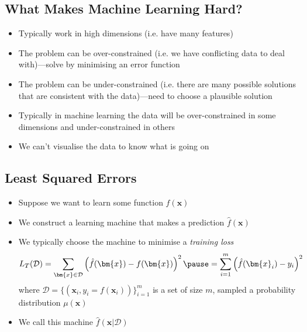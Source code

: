 
\begin{slide}
\section{What Makes Machine Learning Hard?}

\begin{PauseHighLight}
  \begin{itemize}
  \item Typically work in high dimensions (i.e. have many
    features)\pause
  \item The problem can be over-constrained (i.e. we have conflicting
    data to deal with)\pause---solve by minimising an error function\pauseb
  \item The problem can be under-constrained (i.e. there are many
    possible solutions that are consistent with the data)\pause---need to
    choose a plausible solution\pauseb
  \item Typically in machine learning the data will be over-constrained
    in some dimensions and under-constrained in others\pause
  \item We can't visualise the data to know what is going
    on\pause
  \end{itemize}
\end{PauseHighLight}

\end{slide}


\begin{slide}
\section{Least Squared Errors}

\begin{PauseHighLight}
  \begin{itemize}
  \item Suppose we want to learn some function $f(\bm{x})$\pause
  \item We construct a learning machine that makes a prediction
    $\hat{f}(\bm{x})$\pause
  \item We typically choose the machine to  minimise a \textit{training loss}
    \begin{align*}
      L_T(\mathcal{D}) = \sum_{\bm{x}\in\mathcal{D}} \left(
      \hat{f}(\bm{x}) - f(\bm{x}) \right)^2 \pause
      = \sum_{i=1}^m \left(
      \hat{f}(\bm{x}_i) - y_i \right)^2
    \end{align*}
    where $\mathcal{D} = \{(\bm{x}_i, y_i= f(\bm{x}_i))\}_{i=1}^m$ is a set of
    size $m$, sampled a probability distribution $\mu(\bm{x})$\pauseb
  \item We call this machine $\hat{f}(\bm{x}\vert \mathcal{D})$\pauseb
  \end{itemize}
\end{PauseHighLight}

\end{slide}

